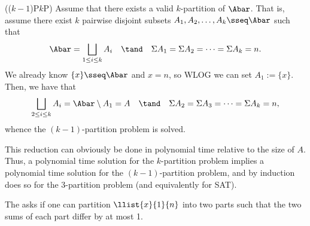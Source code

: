 \documentclass{article}
\begin{document}
\begin{solution}
\begin{subproof}[Correctness.]
    (($ k-1 $)P\pmi $k$P)
    Assume that there exists a valid $ k $-partition of $ \Abar $.
    That is, assume there exist $ k $ pairwise disjoint subsets $ A_1, A_2, \ldots, A_k \sseq \Abar $ such that \begin{align*}
      \Abar = \bigsqcup_{1\leq i \leq k}A_{i} \quad \tand \quad \Sigma A_1 = \Sigma A_2 = \cdots = \Sigma A_{k} = n.
    \end{align*}
    We already know $ \{x\}\sseq \Abar $ and $ x=n $, so WLOG we can set $ A_1 := \{x\} $.
    Then, we have that \begin{align*}
      \bigsqcup_{2\leq i \leq k}A_{i} = \Abar \setminus A_1 = A \quad \tand \quad \Sigma A_2 = \Sigma A_3 = \cdots = \Sigma A_{k} = n,
    \end{align*}
    whence the $ (k-1) $-partition problem is solved.
  \end{subproof}
  This reduction can obviously be done in polynomial time relative to the size of $ A $.
  Thus, a polynomial time solution for the $k$-partition problem implies a polynomial time solution for the $ (k-1) $-partition problem, and by induction does so for the 3-partition problem (and equivalently for SAT).
\end{solution}
\pagebreak


\begin{subexercise}
  The  asks if one can partition $ \llist{x}{1}{n} $ into two parts such that the two sums of each part differ by at most 1.
\end{subexercise}
\end{document}
